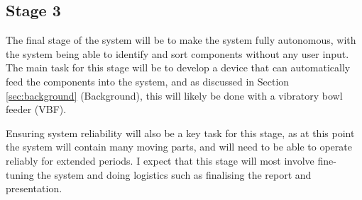 \subsection{Stage 3}
The final stage of the system will be to make the system fully autonomous, with the system being able to identify and sort components without any user input.
The main task for this stage will be to develop a device that can automatically feed the components into the system, and as 
discussed in Section \ref*{sec:background} (Background), this will likely be done with a vibratory bowl feeder (VBF).

Ensuring system reliability will also be a key task for this stage, as at this point the system will contain many moving parts, and will need to be able to
operate reliably for extended periods. I expect that this stage will most involve fine-tuning the system and doing logistics such as
finalising the report and presentation.